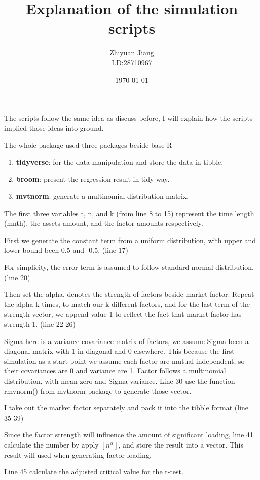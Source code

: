 \documentclass[12pt]{article}
\title{Explanation of the simulation scripts}
\author{Zhiyuan Jiang\\I.D:28710967}
\date{\today}
\begin{document}
\maketitle
The scripts follow the same idea as discuss before, I will explain how the scripts implied those ideas into ground.

The whole package used three packages beside base R
\begin{enumerate}
\item {\bf tidyverse}: for the data manipulation and store the data in tibble.
\item {\bf broom}: present the regression result in tidy way.
\item {\bf mvtnorm}: generate a multinomial distribution matrix.
\end{enumerate}

The first three variables t, n, and k (from line 8 to 15) represent the time length (mnth), the assets amount, and the factor amounts respectively. 

First we generate the constant term from a uniform distribution, with upper and lower bound been 0.5 and -0.5.  (line 17)

For simplicity, the error term is assumed to follow standard normal distribution.(line 20)

Then set the alpha, denotes the strength of factors beside market factor. 
Repeat the alpha k times, to match our k different factors, and for the last term of the strength vector, we append value 1 to reflect the fact that market factor has strength 1. (line 22-26)

Sigma here is a variance-covariance matrix of factors, we assume Sigma been a diagonal matrix with 1 in diagonal and 0 elsewhere.
This because the first simulation as a start point we assume each factor are mutual independent, so their covariances are 0 and variance are 1. 
Factor follows a multinomial distribution, with mean zero and Sigma variance. Line 30 use the function rmvnorm() from mvtnorm package to generate those vector.

I take out the market factor separately and pack it into the tibble format (line 35-39)

Since the factor strength will influence the amount of significant loading, line 41 calculate the number by apply $[n^{\alpha}]$, and store the result into a vector. This result will used when generating factor loading.

Line 45 calculate the adjusted critical value for the t-test.
\end{document}

